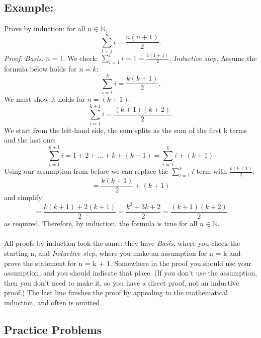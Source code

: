 \documentclass[hidelinks,12pt]{article}
\begin{document}
\subsection{Example:}
Prove by induction: for all $n \in \mathbb{N}$,
\begin{displaymath}
\sum_{i=1}^{n}i = \frac{n(n+1)}{2}.
\end{displaymath}
\emph{Proof.} \emph{Basis:} $n = 1$. We check: $\sum_{i=1}^{i}i = 1 = \frac{1(1+1)}{2}$.
\newline \emph{Inductive step.} Assume the formula below holds for $n = k$:
\begin{displaymath}
\sum_{i=1}^{k}i = \frac{k(k+1)}{2}.
\end{displaymath}
We must show it holds for $n = (k+1)$:
\begin{displaymath}
\sum_{i=1}^{k+1}i = \frac{(k+1)(k+2)}{2}.
\end{displaymath}
We start from the left-hand side, the sum splits as the sum of the first k
terms and the last one:
\begin{displaymath}
\sum_{i=1}^{k+1}i = 1+2+...+k+(k+1) = \sum_{i=1}^{k}i + (k+1)
\end{displaymath}
Using our assumption from before we can replace the $\sum_{i=1}^{k}i$ term with $\frac{k(k+1)}{2}$:
\begin{displaymath}
= \frac{k(k+1)}{2}+(k+1)
\end{displaymath}
and simplify:
\begin{displaymath}
= \frac{k(k+1)+2(k+1)}{2} = \frac{k^2+3k+2}{2} = \frac{(k+1)(k+2)}{2}
\end{displaymath}
as required.
Therefore, by induction, the formula is true for all $n \in \mathbb{N}$.
\paragraph{}
All proofs by induction look the same: they have \emph{Basis}, where
you check the starting n, and \emph{Inductive step}, where you make an assumption
for n = k and prove the statement for n = k + 1.
Somewhere in the proof you should use your assumption, and you should
indicate that place. (If you don’t use the assumption, then you don’t need
to make it, so you have a direct proof, not an inductive proof.)
The last line finishes the proof by appealing to the mathematical induction,
and often is omitted
\subsection{Practice Problems}
\end{document}

